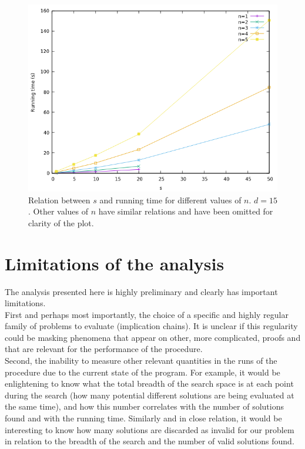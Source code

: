 \documentclass[12pt,a4paper]{article}
\begin{document}
\begin{figure}
\centering
\caption{\label{s_to_time}Relation between $s$ and running time for different values of $n$. $d = 15$. Other values of $n$ have similar relations and have been omitted for clarity of the plot.}
\includegraphics[width=1\textwidth]{s_to_time.png}
\end{figure}

\section{Limitations of the analysis}

The analysis presented here is highly preliminary and clearly has important limitations.\\

First and perhaps most importantly, the choice of a specific and highly regular family of problems to evaluate (implication chains). It is unclear if this regularity could be masking phenomena that appear on other, more complicated, proofs and that are relevant for the performance of the procedure.\\

Second, the inability to measure other relevant quantities in the runs of the procedure due to the current state of the program. For example, it would be enlightening to know what the total breadth of the search space is at each point during the search (how many potential different solutions are being evaluated at the same time), and how this number correlates with the number of solutions found and with the running time. Similarly and in close relation, it would be interesting to know how many solutions are discarded as invalid for our problem in relation to the breadth of the search and the number of valid solutions found.\\
\end{document}
